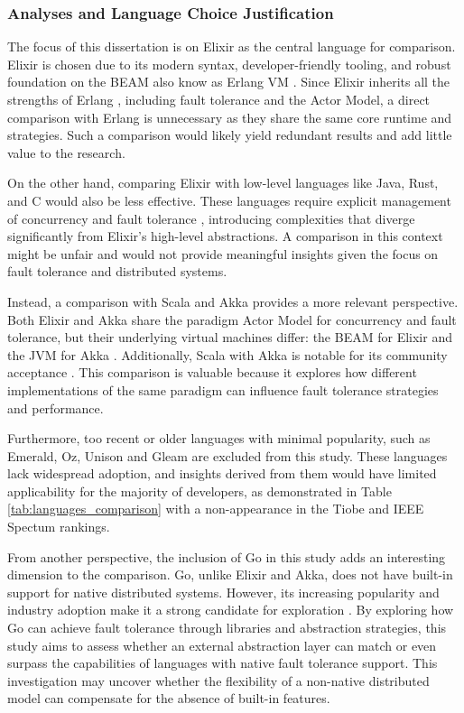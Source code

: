 \subsubsection{Analyses and Language Choice Justification}

The focus of this dissertation is on Elixir as the central language for comparison. Elixir is chosen due to its modern syntax, developer-friendly tooling, and robust foundation on the \gls{BEAM} also know as Erlang \gls{VM} \cite{Juric2024}. Since Elixir inherits all the strengths of Erlang \cite{Valkov2018}, including fault tolerance and the Actor Model, a direct comparison with Erlang is unnecessary as they share the same core runtime and strategies. Such a comparison would likely yield redundant results and add little value to the research.

On the other hand, comparing Elixir with low-level languages like Java, Rust, and C would also be less effective. These languages require explicit management of concurrency and fault tolerance \cite{Valkov2018}, introducing complexities that diverge significantly from Elixir's high-level abstractions. A comparison in this context might be unfair and would not provide meaningful insights given the focus on fault tolerance and distributed systems.

Instead, a comparison with Scala and Akka provides a more relevant perspective. Both Elixir and Akka share the paradigm Actor Model for concurrency and fault tolerance, but their underlying virtual machines differ: the BEAM for Elixir and the \gls{JVM} for Akka \cite{Abraham2023}. Additionally, Scala with Akka is notable for its community acceptance \cite{Valkov2018}. This comparison is valuable because it explores how different implementations of the same paradigm can influence fault tolerance strategies and performance.

Furthermore, too recent or older languages with minimal popularity, such as Emerald, Oz, Unison and Gleam are excluded from this study. These languages lack widespread adoption, and insights derived from them would have limited applicability for the majority of developers, as demonstrated in Table \ref{tab:languages_comparison} with a non-appearance in the Tiobe and IEEE Spectum rankings.

From another perspective, the inclusion of Go in this study adds an interesting dimension to the comparison. Go, unlike Elixir and Akka, does not have built-in support for native distributed systems. However, its increasing popularity and industry adoption make it a strong candidate for exploration \cite{Brolos2021}. By exploring how Go can achieve fault tolerance through libraries and abstraction strategies, this study aims to assess whether an external abstraction layer can match or even surpass the capabilities of languages with native fault tolerance support. This investigation may uncover whether the flexibility of a non-native distributed model can compensate for the absence of built-in features.

